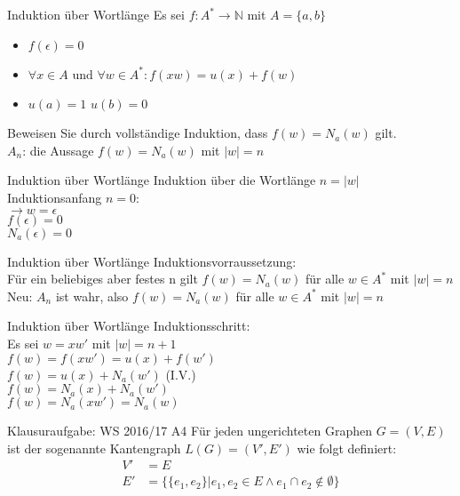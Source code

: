 \begin{frame}{Induktion über Wortlänge}
Es sei $f:A^* \rightarrow \mathbb{N}$ mit $A=\{a,b\}$
\begin{itemize}
\item $f(\epsilon)=0$
\item $\forall x\in A \text{ und } \forall w \in A^* : f(xw)=u(x)+f(w)$
\item $u(a)=1$ $u(b)=0$
\end{itemize}
Beweisen Sie durch vollständige Induktion, dass $f(w)=N_a(w)$ gilt. \\
$A_n$: die Aussage $f(w)=N_a(w)$ mit $|w|=n$
\end{frame}

\begin{frame}{Induktion über Wortlänge}
Induktion über die Wortlänge $n=|w|$\\
Induktionsanfang $n=0$:\\
$\rightarrow w=\epsilon$\\
$f(\epsilon)=0$\\
$N_a(\epsilon)=0$
\end{frame}

\begin{frame}{Induktion über Wortlänge}
Induktionsvorraussetzung:\\
Für ein beliebiges aber festes n gilt $f(w)=N_a(w)$ für alle $w \in A^*$ mit $|w|=n$ \\
Neu: $A_n$ ist wahr, also $f(w)=N_a(w)$ für alle $w \in A^*$ mit $|w|=n$
\end{frame}

\begin{frame}{Induktion über Wortlänge}
Induktionsschritt:\\
Es sei $w=xw'$ mit $|w|=n+1$ \\
$f(w)=f(xw')=u(x)+f(w')$\\
$f(w)=u(x)+N_a(w')$ (I.V.)\\
$f(w)=N_a(x)+N_a(w')$\\
$f(w)=N_a(xw')=N_a(w)$
\end{frame}

\begin{frame}{Klausuraufgabe: WS 2016/17 A4}
  Für jeden ungerichteten Graphen $G=(V,E)$ ist der sogenannte Kantengraph $L(G)=(V',E')$ wie folgt definiert:
  \begin{align*}
    V' &= E\\
    E' &= \{\{e_1,e_2\}|e_1,e_2 \in E \land e_1 \cap e_2 \notin \emptyset \}
  \end{align*}
\end{frame}

